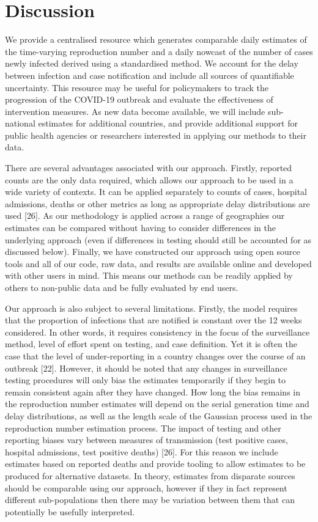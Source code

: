 \documentclass[
]{article}
\begin{document}
\hypertarget{discussion}{%
\section{Discussion}\label{discussion}}

We provide a centralised resource which generates comparable daily
estimates of the time-varying reproduction number and a daily nowcast of
the number of cases newly infected derived using a standardised method.
We account for the delay between infection and case notification and
include all sources of quantifiable uncertainty. This resource may be
useful for policymakers to track the progression of the COVID-19
outbreak and evaluate the effectiveness of intervention measures. As new
data become available, we will include sub-national estimates for
additional countries, and provide additional support for public health
agencies or researchers interested in applying our methods to their
data.

There are several advantages associated with our approach. Firstly,
reported counts are the only data required, which allows our approach to
be used in a wide variety of contexts. It can be applied separately to
counts of cases, hospital admissions, deaths or other metrics as long as
appropriate delay distributions are used {[}26{]}. As our methodology is
applied across a range of geographies our estimates can be compared
without having to consider differences in the underlying approach (even
if differences in testing should still be accounted for as discussed
below). Finally, we have constructed our approach using open source
tools and all of our code, raw data, and results are available online
and developed with other users in mind. This means our methods can be
readily applied by others to non-public data and be fully evaluated by
end users.

Our approach is also subject to several limitations. Firstly, the model
requires that the proportion of infections that are notified is constant
over the 12 weeks considered. In other words, it requires consistency in
the focus of the surveillance method, level of effort spent on testing,
and case definition. Yet it is often the case that the level of
under-reporting in a country changes over the course of an outbreak
{[}22{]}. However, it should be noted that any changes in surveillance
testing procedures will only bias the estimates temporarily if they
begin to remain consistent again after they have changed. How long the
bias remains in the reproduction number estimates will depend on the
serial generation time and delay distributions, as well as the length
scale of the Gaussian process used in the reproduction number estimation
process. The impact of testing and other reporting biases vary between
measures of transmission (test positive cases, hospital admissions, test
positive deaths) {[}26{]}. For this reason we include estimates based on
reported deaths and provide tooling to allow estimates to be produced
for alternative datasets. In theory, estimates from disparate sources
should be comparable using our approach, however if they in fact
represent different sub-populations then there may be variation between
them that can potentially be usefully interpreted.
\end{document}

